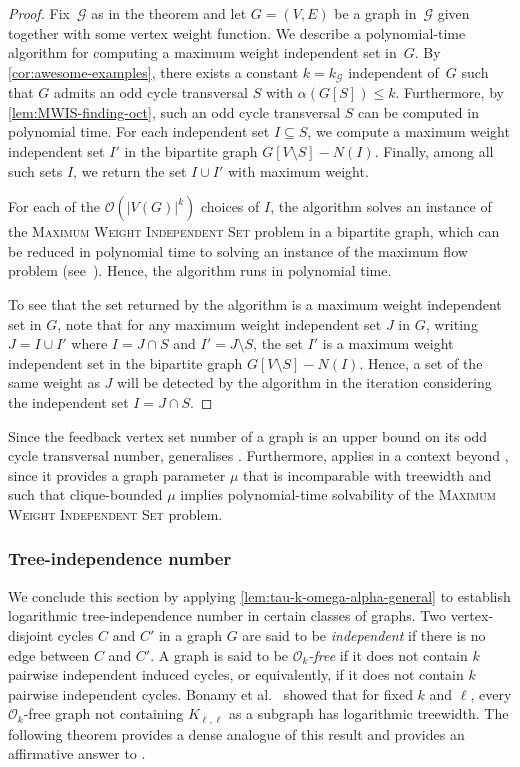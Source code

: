\documentclass[11pt]{article}
\theoremstyle{plain}
\theoremstyle{definition}
\theoremstyle{remark}
\numberwithin{equation}{section}
\begin{document}
\begin{proof}
Fix~$\mathcal{G}$ as in the theorem and let $G = (V,E)$ be a graph in~$\mathcal{G}$ given together with some vertex weight function.
We describe a polynomial-time algorithm for computing a maximum weight independent set in~$G$.
By \cref{cor:awesome-examples}, there exists a constant $k = k_\mathcal{G}$ independent of~$G$ such that $G$ admits an odd cycle transversal $S$ with $\alpha(G[S])\le k$.
Furthermore, by \cref{lem:MWIS-finding-oct}, such an odd cycle transversal $S$ can be computed in polynomial time.
For each independent set $I\subseteq S$, we compute a maximum weight independent set $I'$ in the bipartite graph $G[V\setminus S]-N(I)$.
Finally, among all such sets $I$, we return the set $I\cup I'$ with maximum weight.

For each of the $\mathcal{O}(|V(G)|^k)$ choices of $I$, the algorithm solves an instance of the \textsc{Maximum Weight Independent Set} problem in a bipartite graph, which can be reduced in polynomial time to solving an instance of the maximum flow problem (see~\cite{MR712925}).
Hence, the algorithm runs in polynomial time.

To see that the set returned by the algorithm is a maximum weight independent set in $G$, note that for any maximum weight independent set $J$ in $G$, writing $J = I \cup I'$ where $I = J\cap S$ and $I' = J\setminus S$, the set $I'$ is a maximum weight independent set in the bipartite graph $G[V\setminus S]-N(I)$.
Hence, a set of the same weight as $J$ will be detected by the algorithm in the iteration considering the independent set $I = J\cap S$.
\end{proof}

Since the feedback vertex set number of a graph is an upper bound on its odd cycle transversal number,  generalises .
Furthermore,  applies in a context beyond , since it provides a graph parameter $\mu$ that is incomparable with treewidth and such that clique-bounded $\mu$ implies polynomial-time solvability of the \textsc{Maximum Weight Independent Set} problem.

\subsubsection{Tree-independence number}

We conclude this section by applying \cref{lem:tau-k-omega-alpha-general} to establish logarithmic tree-independence number in certain classes of graphs.
Two vertex-disjoint cycles $C$ and $C'$ in a graph $G$ are said to be \emph{independent} if there is no edge between $C$ and $C'$. 
A graph is said to be \emph{$\mathcal{O}_k$-free} if it does not contain $k$ pairwise independent induced cycles, or equivalently, if it does not contain $k$ pairwise independent cycles.
Bonamy et al.~\cite{MR4723425} showed that for fixed $k$ and $\ell$, every $\mathcal{O}_k$-free graph not containing $K_{\ell,\ell}$ as a subgraph has logarithmic treewidth.
The following theorem provides a dense analogue of this result and provides an affirmative answer to \cite[Question 7.3]{HMV25}.
\end{document}
